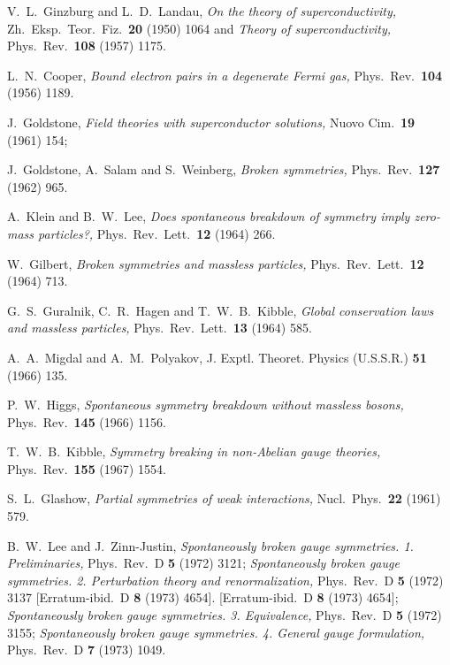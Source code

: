 \documentclass[12pt]{article}
\numberwithin{equation}{section}
\begin{document}
\begin{thebibliography}{99}
V.~L.~Ginzburg and L.~D.~Landau,
{\it On the theory of superconductivity,}
  Zh.\ Eksp.\ Teor.\ Fiz.\  {\bf 20} (1950) 1064 and
{\it Theory of superconductivity,}
  Phys.\ Rev.\  {\bf 108} (1957) 1175.
  
L.~N.~Cooper,
{\it Bound electron pairs in a degenerate Fermi gas,}
Phys.\ Rev.\ {\bf 104} (1956) 1189.

J.~Goldstone,
{\it Field theories with superconductor solutions,}
  Nuovo Cim.\  {\bf 19} (1961) 154;

J.~Goldstone, A.~Salam and S.~Weinberg,
{\it Broken symmetries,}
  Phys.\ Rev.\  {\bf 127} (1962) 965.

A.~Klein and B.~W.~Lee,
{\it Does spontaneous breakdown of symmetry imply zero-mass particles?,}
  Phys.\ Rev.\ Lett.\  {\bf 12} (1964) 266.

W.~Gilbert,
{\it Broken symmetries and massless particles,}
  Phys.\ Rev.\ Lett.\  {\bf 12} (1964) 713.

G.~S.~Guralnik, C.~R.~Hagen and T.~W.~B.~Kibble,
{\it Global conservation laws and massless particles,}
  Phys.\ Rev.\ Lett.\  {\bf 13} (1964) 585.

A.~A.~Migdal and A.~M.~Polyakov,
J. Exptl. Theoret. Physics (U.S.S.R.) {\bf 51} (1966) 135.

P.~W.~Higgs,
{\it Spontaneous symmetry breakdown without massless bosons,}
  Phys.\ Rev.\  {\bf 145} (1966) 1156.

T.~W.~B.~Kibble,
{\it Symmetry breaking in non-Abelian gauge theories,}
  Phys.\ Rev.\  {\bf 155} (1967) 1554.
  
  S.~L.~Glashow,
{\it Partial symmetries of weak interactions,}
  Nucl.\ Phys.\  {\bf 22} (1961) 579.

B.~W.~Lee and J.~Zinn-Justin,
{\it Spontaneously broken gauge symmetries. 1. Preliminaries,}
  Phys.\ Rev.\  D {\bf 5} (1972) 3121;
 {\it Spontaneously broken gauge symmetries. 2. Perturbation theory and  renormalization,}
  Phys.\ Rev.\  D {\bf 5} (1972) 3137
  [Erratum-ibid.\  D {\bf 8} (1973) 4654].
  [Erratum-ibid.\  D {\bf 8} (1973) 4654];
{\it Spontaneously broken gauge symmetries. 3. Equivalence,}
  Phys.\ Rev.\  D {\bf 5} (1972) 3155;
{\it Spontaneously broken gauge symmetries. 4. General gauge formulation,}
  Phys.\ Rev.\  D {\bf 7} (1973) 1049.
  

\end{thebibliography}
\end{document}

